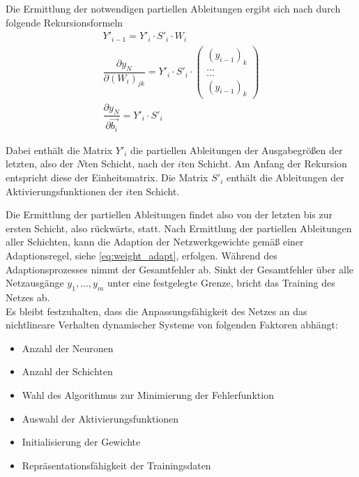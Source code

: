 Die Ermittlung der notwendigen partiellen Ableitungen ergibt sich nach \cite{Sturm.2000} durch folgende Rekursionsformeln \\

\begin{equation}
\begin{aligned}
Y'_{i-1} = Y'_i \cdot S'_i \cdot W_i \\
\dfrac{\partial y_N}{\partial (W_i)_{jk}} = Y'_i \cdot S'_i \cdot \left(\begin{array}{c}
(y_{i-1})_k  \\ ... \\ ... \\ (y_{i-1})_k 
\end{array}\right) \\
\dfrac{\partial y_N}{\partial \vec{b_i}} = Y'_i \cdot S'_i
\end{aligned}
\end{equation}

Dabei enthält die Matrix $Y'_i$ die partiellen Ableitungen der Ausgabegrößen der letzten, also der $N$ten Schicht, nach der $i$ten Schicht. Am Anfang der Rekursion entspricht diese der Einheitsmatrix. Die Matrix $S'_i$ enthält die Ableitungen der Aktivierungsfunktionen der $i$ten Schicht. \cite{Sturm.2000}


Die Ermittlung der partiellen Ableitungen findet also von der letzten bis zur ersten Schicht, also rückwärts, statt. Nach Ermittlung der partiellen Ableitungen aller Schichten, kann die Adaption der Netzwerkgewichte gemäß einer Adaptionsregel, siehe \ref{eq:weight_adapt}, erfolgen. Während des Adaptionsprozesses nimmt der Gesamtfehler ab. Sinkt der Gesamtfehler über alle Netzausgänge $y_1,...,y_m$ unter eine festgelegte Grenze, bricht das Training des Netzes ab. \\


Es bleibt festzuhalten, dass die Anpassungsfähigkeit des Netzes an das nichtlineare Verhalten dynamischer Systeme von folgenden Faktoren abhängt:

\begin{itemize}
	\item Anzahl der Neuronen
	\item Anzahl der Schichten
	\item Wahl des Algorithmus zur Minimierung der Fehlerfunktion
	\item Auswahl der Aktivierungsfunktionen
	\item Initialisierung der Gewichte
	\item Repräsentationsfähigkeit der Trainingsdaten
	
\end{itemize}

